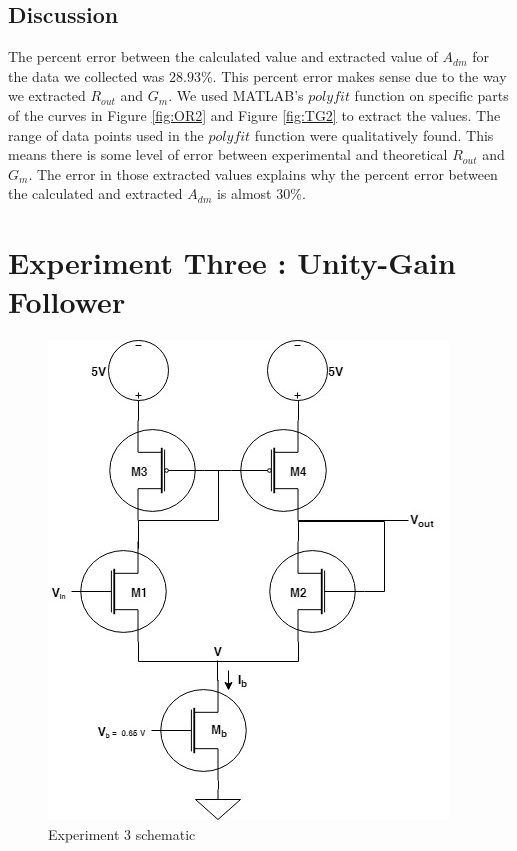 \documentclass{article}
\begin{document}
\subsection{Discussion}
The percent error between the calculated value and extracted value of $A_{dm}$ for the data we collected was $28.93 \%$.  This percent error makes sense due to the way we extracted $R_{out}$ and $G_{m}$.  We used MATLAB's $polyfit$ function on specific parts of the curves in Figure \ref{fig:OR2} and Figure \ref{fig:TG2} to extract the values.  The range of data points used in the $polyfit$ function were qualitatively found.   This means there is some level of error between experimental and theoretical $R_{out}$ and $G_{m}$.  The error in those extracted values explains why the percent error between the calculated and extracted $A_{dm}$ is almost $30 \%$.

\section{Experiment Three : Unity-Gain Follower}

\begin{figure}[H]
  \begin{center}      
  \includegraphics[scale = 0.5]{images/exp3_schematic.jpg}
  \caption{Experiment 3 schematic}   
  \label{fig:exp3_schematic}
  \end{center}
\end{figure}
\end{document}
